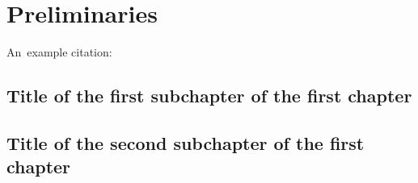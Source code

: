 \chapter{Preliminaries}

An~example citation: \cite{Andel07}

\section{Title of the first subchapter of the first chapter}

\section{Title of the second subchapter of the first chapter}

